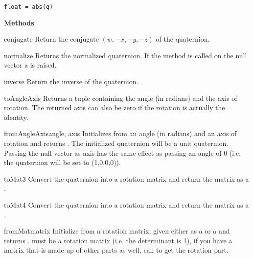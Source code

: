 \begin{verbatim}
float = abs(q)
\end{verbatim}

{\bf Methods}

\begin{methoddesc}{conjugate}{}
Return the conjugate $(w, -x, -y, -z)$ of the quaternion.
\end{methoddesc}

\begin{methoddesc}{normalize}{}
Returns the normalized quaternion. If the method is called on the null
vector a  is raised.
\end{methoddesc}

\begin{methoddesc}{inverse}{}
Return the inverse of the quaternion.
\end{methoddesc}

\begin{methoddesc}{toAngleAxis}{}
Returns a tuple containing the angle (in radians) and the axis of rotation.
The returned axis can also be zero if the rotation is actually the identity.
\end{methoddesc}

\begin{methoddesc}{fromAngleAxis}{angle, axis}
Initializes  from an angle (in radians) and an axis of
rotation and returns . The initialized quaternion will be a
unit quaternion. Passing the null vector as axis has the same effect
as passing an angle of 0 (i.e. the quaternion will be set to (1,0,0,0)).
\end{methoddesc}

\begin{methoddesc}{toMat3}{}
Convert the quaternion into a rotation matrix and return the matrix as a 
.
\end{methoddesc}

\begin{methoddesc}{toMat4}{}
Convert the quaternion into a rotation matrix and return the matrix as a 
.
\end{methoddesc}

\begin{methoddesc}{fromMat}{matrix}
Initialize  from a rotation matrix, given either as a
 or a  and returns .  must be
a rotation matrix (i.e. the determinant is 1), if you have a matrix
that is made up of other parts as well, call  to get
the rotation part.
\end{methoddesc}

